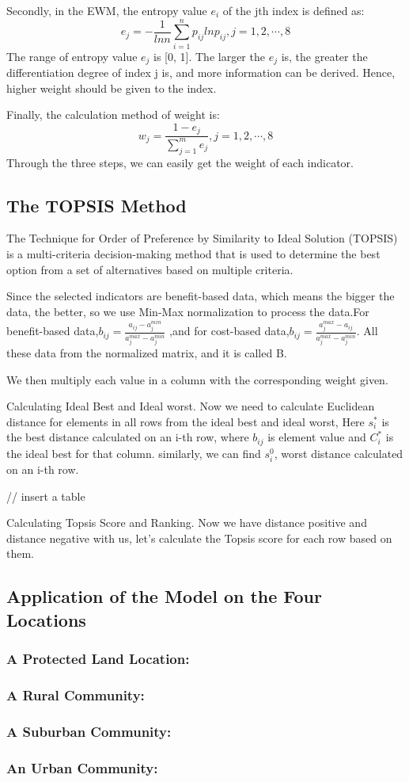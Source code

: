 Secondly, in the EWM, the entropy value $e_i$ of the jth index is defined as:$$e_j=-\frac{1}{lnn}\sum_{i=1}^np_{ij}lnp_{ij},j=1,2,\cdots,8$$
The range of entropy value $e_j$ is [0, 1]. The larger the $e_j$ is, the greater the differentiation degree of index j is, and more information can be derived. Hence, higher weight should be given to the index. 

Finally, the calculation method of weight is:$$w_j=\frac{1-e_j}{\sum_{j=1}^me_j},j=1,2,\cdots,8$$
Through the three steps, we can easily get the weight of each indicator.

\subsection{The TOPSIS Method}
The Technique for Order of Preference by Similarity to Ideal Solution (TOPSIS) is a multi-criteria decision-making method that is used to determine the best option from a set of alternatives based on multiple criteria. 

Since the selected indicators are benefit-based data, which means the bigger the data, the better, so we use Min-Max normalization to process the data.For benefit-based data,$b_{ij}=\frac{a_{ij}-a_j^{min}}{a_j^{max}-a_j^{min}}$ ,and for cost-based data,$b_{ij}=\frac{a_{j}^{max}-a_{ij}}{a_j^{max}-a_j^{min}}$. All these data from the normalized matrix, and it is called B.

We then multiply each value in a column with the corresponding weight given.

Calculating Ideal Best and Ideal worst. Now we need to calculate Euclidean distance for elements in all rows from the ideal best and ideal worst, Here $s_i^*$ is the best distance calculated on an i-th row, where $b_{ij}$ is element value and $C_i^{*}$ is the ideal best for that column. similarly, we can find $s_i^0$, worst distance calculated on an i-th row.

// insert a table

Calculating Topsis Score and Ranking. Now we have distance positive and distance negative with us, let’s calculate the Topsis score for each row based on them.

\subsection{Application of the Model on the Four Locations}
\subsubsection{A Protected Land Location: }
\subsubsection{A Rural Community: }
\subsubsection{A Suburban Community: }
\subsubsection{An Urban Community: }